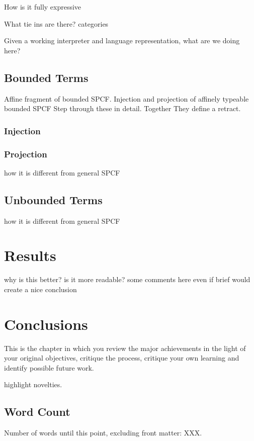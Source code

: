 \documentclass[12pt,a4paper]{report}
\theoremstyle{definition}
\theoremstyle{remark}
\begin{document}
How is it fully expressive

What tie ins are there? categories

Given a working interpreter
and language representation, what are we doing here?

\section{Bounded Terms}

Affine fragment of bounded SPCF.
Injection and projection of affinely typeable bounded SPCF
Step through these in detail. Together They define a retract. 
\subsection{Injection}

\subsection{Projection}

how it is different from general SPCF
\section{Unbounded Terms}
how it is different from general SPCF

\chapter{Results}
why is this better?
is it more readable?
some comments here even if brief would create a nice conclusion

\chapter{Conclusions}


This is the chapter in which you review the major achievements in the light of your original objectives, critique the process, critique your own learning and identify possible future work.

highlight novelties.

\vfill
\section{Word Count}
Number of words until this point, excluding front matter: XXX.
\end{document}

